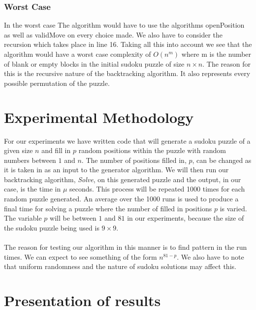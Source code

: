 \documentclass[12pt,a4paper,titlepage]{article}
\begin{document}
\subsubsection{Worst Case}

In the worst case The algorithm would have to use the algorithms openPosition as well as validMove on every choice made. We also have to consider the recursion which takes place in line 16. Taking all this into account we see that the algorithm would have a worst case complexity of $O(n^{m})$ where m is the number of blank or empty blocks in the initial sudoku puzzle of size $n \times n$. The reason for this is the recursive nature of the backtracking algorithm. It also represents every possible permutation of the puzzle.


\section{Experimental Methodology}

For our experiments we have written code that will generate a sudoku puzzle of a given size $n$ and fill in $p$ random positions within the puzzle with random numbers between $1$ and $n$. The number of positions filled in, $p$, can be changed as it is taken in as an input to the generator algorithm. We will then run our backtracking algorithm, \emph{Solve}, on this generated puzzle and the output, in our case, is the time in $\mu$ seconds. This process will be repeated 1000 times for each random puzzle generated. An average over the 1000 runs is used to produce a final time for solving a puzzle where the number of filled in positions $p$ is varied. The variable $p$ will be between $1$ and $81$ in our experiments, because the size of the sudoku puzzle being used is $9\times 9$.
\\
\\
The reason for testing our algorithm in this manner is to find pattern in the run times. We can expect to see something of the form $n^{81-p}$. We also have to note that uniform randomness and the nature of sudoku solutions may affect this.

\section{Presentation of results}
\end{document}
